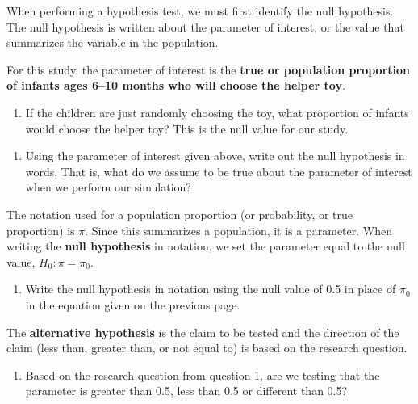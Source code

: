 \documentclass[
]{report}
\providecommand{\tightlist}{%
  \setlength{\itemsep}{0pt}\setlength{\parskip}{0pt}}
\begin{document}
When performing a hypothesis test, we must first identify the null hypothesis. The null hypothesis is written about the parameter of interest, or the value that summarizes the variable in the population.

For this study, the parameter of interest is the \textbf{true or population proportion of infants ages 6--10 months who will choose the helper toy}.

\begin{enumerate}
\def\labelenumi{\arabic{enumi}.}
\setcounter{enumi}{4}
\tightlist
\item
  If the children are just randomly choosing the toy, what proportion of infants would choose the helper toy? This is the null value for our study.
\end{enumerate}

\vspace{0.3in}

\begin{enumerate}
\def\labelenumi{\arabic{enumi}.}
\setcounter{enumi}{5}
\tightlist
\item
  Using the parameter of interest given above, write out the null hypothesis in words. That is, what do we assume to be true about the parameter of interest when we perform our simulation?
  \vspace{0.8in}
\end{enumerate}

The notation used for a population proportion (or probability, or true proportion) is \(\pi\). Since this summarizes a population, it is a parameter. When writing the \textbf{null hypothesis} in notation, we set the parameter equal to the null value, \(H_0: \pi = \pi_0\).

\newpage

\begin{enumerate}
\def\labelenumi{\arabic{enumi}.}
\setcounter{enumi}{6}
\tightlist
\item
  Write the null hypothesis in notation using the null value of 0.5 in place of \(\pi_0\) in the equation given on the previous page.
\end{enumerate}

\vspace{0.5in}

The \textbf{alternative hypothesis} is the claim to be tested and the direction of the claim (less than, greater than, or not equal to) is based on the research question.

\begin{enumerate}
\def\labelenumi{\arabic{enumi}.}
\setcounter{enumi}{7}
\tightlist
\item
  Based on the research question from question 1, are we testing that the parameter is greater than 0.5, less than 0.5 or different than 0.5?
\end{enumerate}
\end{document}
